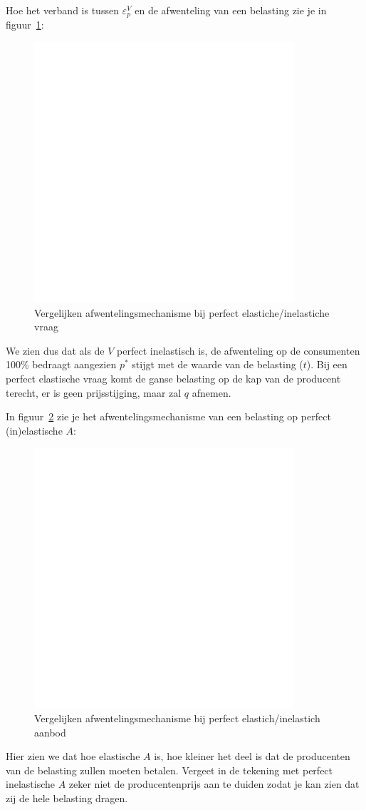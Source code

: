 Hoe het verband is tussen $\varepsilon^{V}_p$ en de afwenteling van een belasting zie je in figuur~\ref{fig:vergelijkAfwentelingVraag}:
\begin{figure}[htbp]
	\centering
	\includegraphics[scale=0.4]{Images/white.png}
	\caption{Vergelijken afwentelingsmechanisme bij perfect elastiche/inelastiche vraag}
	\label{fig:vergelijkAfwentelingVraag}
\end{figure}
We zien dus dat als de $V$ perfect inelastisch is, de afwenteling op de consumenten 100\% bedraagt aangezien $p^*$ stijgt met de waarde van de belasting ($t$). Bij een perfect elastische vraag komt de ganse belasting op de kap van de producent terecht, er is geen prijsstijging, maar zal $q$ afnemen.

In figuur~\ref{fig:vergelijkAfwentelingAanbod} zie je het afwentelingsmechanisme van een belasting op perfect (in)elastische $A$:
\begin{figure}[htbp]
	\centering
	\includegraphics[scale=0.4]{Images/white.png}
	\caption{Vergelijken afwentelingsmechanisme bij perfect elastich/inelastich aanbod}
	\label{fig:vergelijkAfwentelingAanbod}
\end{figure}
Hier zien we dat hoe elastische $A$ is, hoe kleiner het deel is dat de producenten van de belasting zullen moeten betalen. Vergeet in de tekening met perfect inelastische $A$ zeker niet de producentenprijs aan te duiden zodat je kan zien dat zij de hele belasting dragen.

